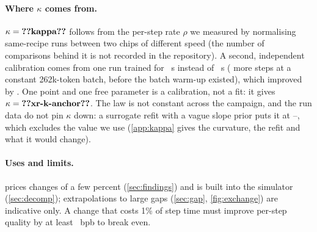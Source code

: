 \begin{center}
\end{center}

\paragraph{Where $\kappa$ comes from.} $\kappa=\val{kappa}$ follows from the per-step rate $\rho$ we measured by normalising
same-recipe runs between two chips of different speed\docnum{} (the number of comparisons behind it is not recorded
in the repository). A second, independent calibration comes from one
 run trained for \docnum{}~s instead of \docnum{}~s
( more steps at a constant 262k-token batch, before the batch warm-up existed), which improved
\valbpb{} by \docnum{}. One point and one free parameter is a calibration, not a fit: it gives
$\kappa=\val{xr-k-anchor}$. The law is not constant across the campaign, and the run data do not pin $\kappa$ down:
a surrogate refit with a vague slope prior puts it at --, which excludes the
value we use (\cref{app:kappa} gives the curvature, the refit and what it would change).

\paragraph{Uses and limits.}  prices changes of a few percent (\cref{sec:findings}) and is built
into the simulator (\cref{sec:decomp}); extrapolations to large gaps (\cref{sec:gap}, \cref{fig:exchange}) are
indicative only. A change that costs 1\% of step time must improve per-step quality by at least
~bpb to break even.

